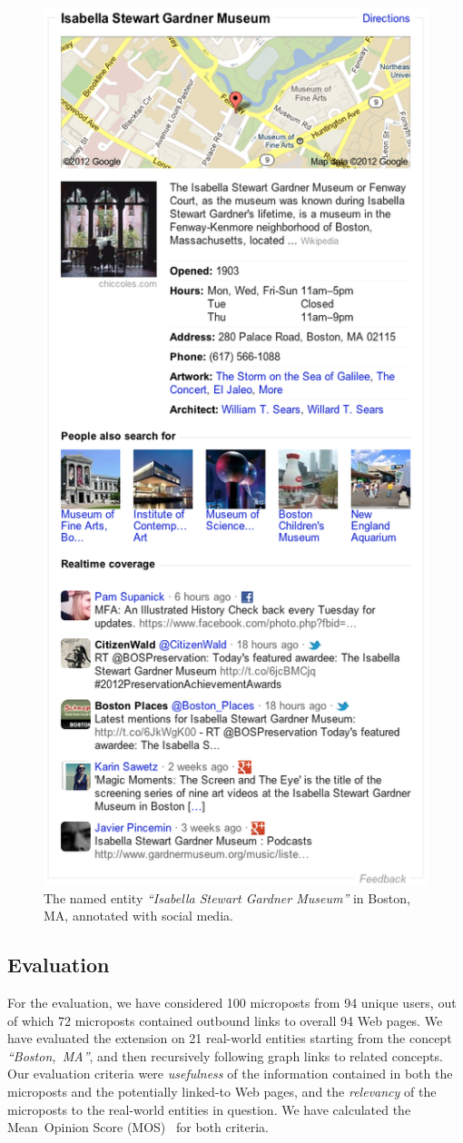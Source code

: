 \begin{figure}[htb]
\centering
\includegraphics[width=0.5\columnwidth]{knowledge_graph_socializer.png}
\caption{The named entity \emph{``Isabella Stewart Gardner Museum''} in Boston, MA, annotated with social media.}
\label{fig:socializer}
\end{figure}

\subsection{Evaluation}
For the evaluation, we have considered 100 microposts from 94 unique users,
out of which 72 microposts contained outbound links to overall 94 Web pages.
We have evaluated the extension on 21 real-world entities starting from the concept
\emph{``Boston,~MA''}, and then recursively following graph links to related concepts.
Our evaluation criteria were \emph{usefulness} of the information
contained in both the microposts and the potentially linked-to Web pages,
and the \emph{relevancy} of the microposts to the real-world entities in question.
We have calculated the Mean~Opinion Score (MOS)~\cite{mos1998} for both criteria.

